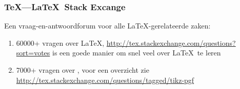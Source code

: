 \begin{frame}
  \frametitle{\TeX---\LaTeX\  Stack Excange}

  \small
  Een vraag-en-antwoordforum voor alle \LaTeX-gerelateerde zaken:
  \begin{enumerate}
    \item 60000+ vragen over \LaTeX, \url{http://tex.stackexchange.com/questions?sort=votes} is een goede manier om snel veel over \LaTeX\ te leren
    \item 7000+ vragen over \TikZ, voor een overzicht zie \url{http://tex.stackexchange.com/questions/tagged/tikz-pgf}
  \end{enumerate}
\end{frame}

